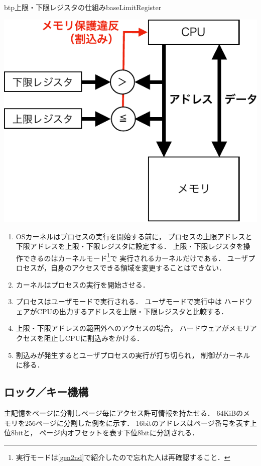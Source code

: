 \begin{myfig}{btp}{上限・下限レジスタの仕組み}{baseLimitRegister}
\begin{minipage}{0.49\columnwidth}
\begin{center}
      \includegraphics[scale=0.66]{Fig/baseLimitHardware-crop.pdf}
      \label{fig:baseLimitHardware}
    \end{center}
  \end{minipage}
\end{myfig}

\begin{enumerate}
\item OSカーネルはプロセスの実行を開始する前に，
  プロセスの上限アドレスと下限アドレスを上限・下限レジスタに設定する．
  上限・下限レジスタを操作できるのはカーネルモード\footnote{
    実行モードは\ref{gen2nd}で紹介したので忘れた人は再確認すること．}で
  実行されるカーネルだけである．
  ユーザプロセスが，自身のアクセスできる領域を変更することはできない．
\item カーネルはプロセスの実行を開始させる．
\item プロセスはユーザモードで実行される．
  ユーザモードで実行中は
  ハードウェアがCPUの出力するアドレスを上限・下限レジスタと比較する．
\item 上限・下限アドレスの範囲外へのアクセスの場合，
  ハードウェアがメモリアクセスを阻止しCPUに割込みをかける．
\item 割込みが発生するとユーザプロセスの実行が打ち切られ，
  制御がカーネルに移る．
\end{enumerate}

\subsection{ロック／キー機構}
主記憶をページに分割しページ毎にアクセス許可情報を持たせる．
64KiBのメモリを256ページに分割した例をに示す．
16bitのアドレスはページ番号を表す上位8bitと，
ページ内オフセットを表す下位8bitに分割される．

